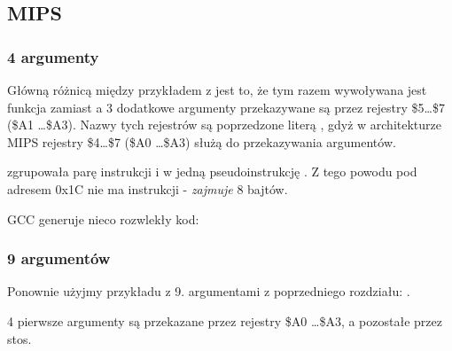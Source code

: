 \subsection{MIPS}

\subsubsection{4 argumenty}


Główną różnicą między przykładem z \q{\HelloWorldSectionName} jest to, że tym razem wywoływana jest funkcja \printf zamiast \puts a 3 dodatkowe argumenty przekazywane są przez rejestry  \$5\dots \$7 (\$A1 \dots \$A3).
Nazwy tych rejestrów są poprzedzone literą , gdyż w architekturze MIPS rejestry \$4\dots \$7 (\$A0 \dots \$A3) służą do przekazywania argumentów.





\IDA zgrupowała parę instrukcji  i  w jedną pseudoinstrukcję .
Z tego powodu pod adresem 0x1C nie ma instrukcji -  \emph{zajmuje} 8 bajtów.


\NonOptimizing GCC generuje nieco rozwlekły kod:





\subsubsection{9 argumentów}

Ponownie użyjmy przykładu z 9. argumentami z poprzedniego rozdziału: .




4 pierwsze argumenty są przekazane przez rejestry \$A0 \dots \$A3, a pozostałe przez stos.

